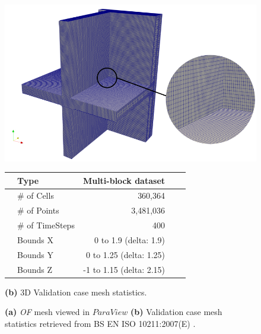 \begin{figure}[htb]
    \centering
    \begin{minipage}[t]{0.75\columnwidth}
        \centering
        \includegraphics[width=\linewidth]{Figures/mesh3.png}
    \end{minipage}
    \hfill
    \begin{minipage}[t]{0.5\columnwidth}
        \centering
        \begin{tabular}{clrrr}    
            \toprule
            & Type       & Multi-block dataset   \\ \midrule
            & \# of Cells & 360,364                      \\
            & \# of Points                        & 3,481,036                  \\
            & \# of TimeSteps                  & 400                        \\
            & Bounds X          & 0 to 1.9 (delta: 1.9) \\
            & Bounds Y          &                     0 to 1.25 (delta: 1.25) \\
            & Bounds Z          &                     -1 to 1.15 (delta: 2.15)    \\  \bottomrule
        \end{tabular}
        \caption*{\textbf{(b)} 3D Validation case mesh statistics.}
        \label{tab:mesh-stats}
    \end{minipage}
    
    \caption[3D Validation Mesh and Mesh Statistics]{\textbf{(a)} \textit{ \gls{OF}} mesh viewed in $ParaView$ \textbf{(b)}  Validation case mesh statistics retrieved from BS EN ISO 10211:2007(E) \cite{ISO}.}
    \label{fig:validation-case}
\end{figure}






